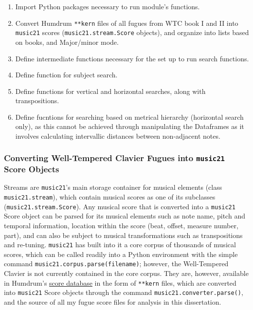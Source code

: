 \begin{enumerate}
\def\labelenumi{\arabic{enumi}.}
\tightlist
\item
  Import Python packages necessary to run module's functions.
\item
  Convert Humdrum \texttt{**kern} files of all fugues from WTC book I
  and II into \texttt{music21} scores (\texttt{music21.stream.Score}
  objects), and organize into lists based on books, and Major/minor
  mode.
\item
  Define intermediate functions necessary for the set up to run search
  functions.
\item
  Define function for subject search.
\item
  Define functions for vertical and horizontal searches, along with
  transpositions.
\item
  Define fucntions for searching based on metrical hierarchy (horizontal
  search only), as this cannot be achieved through manipulating the
  Dataframes as it involves calculating intervallic distances between
  non-adjacent notes.
\end{enumerate}

\subsubsection{\texorpdfstring{Converting Well-Tempered Clavier Fugues
into \texttt{music21} Score
Objects}{Converting Well-Tempered Clavier Fugues into music21 Score Objects}}\label{converting-well-tempered-clavier-fugues-into-music21-score-objects}

Streams are \texttt{music21}'s main storage container for musical
elements (class \texttt{music21.stream}), which contain musical scores
as one of its subclasses (\texttt{music21.stream.Score}). Any musical
score that is converted into a \texttt{music21} Score object can be
parsed for its musical elements such as note name, pitch and temporal
information, location within the score (beat, offset, measure number,
part), and can also be subject to musical transformations such as
transpositions and re-tuning. \texttt{music21} has built into it a core
corpus of thousands of musical scores, which can be called readily into
a Python environment with the simple command
\texttt{music21.corpus.parse(\textquotesingle{}filename\textquotesingle{})};
however, the Well-Tempered Clavier is not currently contained in the
core corpus. They are, however, available in Humdrum's
\href{http://kern.ccarh.org/}{score database} in the form of
\texttt{**kern} files, which are converted into \texttt{music21} Score
objects through the command \texttt{music21.converter.parse()}, and the
source of all my fugue score files for analysis in this dissertation.


